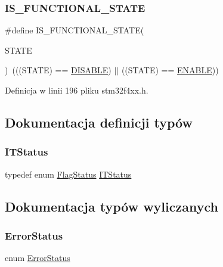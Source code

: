 \subsubsection{\texorpdfstring{I\+S\+\_\+\+F\+U\+N\+C\+T\+I\+O\+N\+A\+L\+\_\+\+S\+T\+A\+TE}{IS\_FUNCTIONAL\_STATE}}
{\footnotesize\ttfamily \#define I\+S\+\_\+\+F\+U\+N\+C\+T\+I\+O\+N\+A\+L\+\_\+\+S\+T\+A\+TE(\begin{DoxyParamCaption}\item[{}]{S\+T\+A\+TE }\end{DoxyParamCaption})~(((S\+T\+A\+TE) == \hyperlink{group___exported__types_ggac9a7e9a35d2513ec15c3b537aaa4fba1ad3a9df141be0ccf10389b640f492b26d}{D\+I\+S\+A\+B\+LE}) $\vert$$\vert$ ((S\+T\+A\+TE) == \hyperlink{group___exported__types_ggac9a7e9a35d2513ec15c3b537aaa4fba1a7d46875fa3ebd2c34d2756950eda83bf}{E\+N\+A\+B\+LE}))}



Definicja w linii 196 pliku stm32f4xx.\+h.



\subsection{Dokumentacja definicji typów}
\mbox{\label{group___exported__types_gaacbd7ed539db0aacd973a0f6eca34074}} 
\subsubsection{\texorpdfstring{I\+T\+Status}{ITStatus}}
{\footnotesize\ttfamily typedef  enum \hyperlink{group___exported__types_ga89136caac2e14c55151f527ac02daaff}{Flag\+Status}  \hyperlink{group___exported__types_gaacbd7ed539db0aacd973a0f6eca34074}{I\+T\+Status}}



\subsection{Dokumentacja typów wyliczanych}
\mbox{\label{group___exported__types_ga8333b96c67f83cba354b3407fcbb6ee8}} 
\subsubsection{\texorpdfstring{Error\+Status}{ErrorStatus}}
{\footnotesize\ttfamily enum \hyperlink{group___exported__types_ga8333b96c67f83cba354b3407fcbb6ee8}{Error\+Status}}

